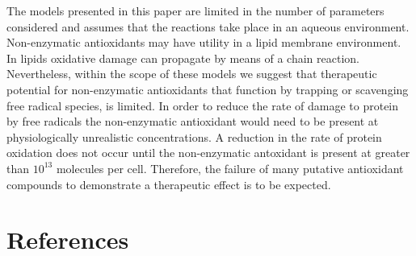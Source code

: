\documentclass[preprint,12pt,authoryear]{elsarticle}
\begin{document}
The models presented in this paper are limited in the number of parameters considered and assumes that the reactions take place in an aqueous environment. 
Non-enzymatic antioxidants may have utility in a lipid membrane environment. In lipids oxidative damage can propagate by means of a chain reaction.
Nevertheless, within the scope of these models we suggest that  therapeutic potential for non-enzymatic antioxidants that function by trapping 
or scavenging free radical species, is limited. 
In order to reduce the rate of damage to protein by free radicals the non-enzymatic antioxidant would need to be present at physiologically unrealistic concentrations. A reduction in the rate of protein oxidation does not occur until the non-enzymatic antoxidant is present at greater than
$10^{13}$ molecules per cell.
Therefore,  the failure of many putative antioxidant compounds to demonstrate a therapeutic effect is to be expected.










%
\section{References}
\end{document}
